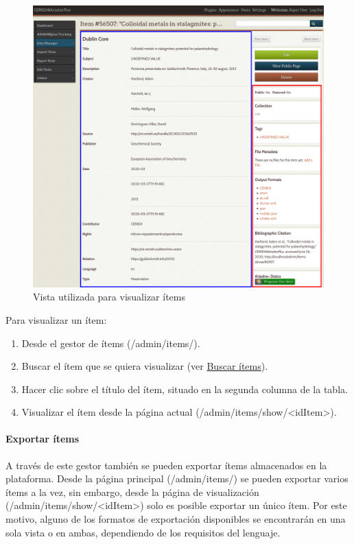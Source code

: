 \documentclass[
]{article}
\providecommand{\tightlist}{%
  \setlength{\itemsep}{0pt}\setlength{\parskip}{0pt}}
\begin{document}
\begin{figure}
\hypertarget{show-items-view}{%
\centering
\includegraphics{../_static/images/show-items-view.png}
\caption{Vista utilizada para visualizar ítems}\label{show-items-view}
}
\end{figure}

Para visualizar un ítem:

\begin{enumerate}
\def\labelenumi{\arabic{enumi}.}
\tightlist
\item
  Desde el gestor de ítems ({/admin/items/}).
\item
  Buscar el ítem que se quiera visualizar (ver
  \protect\hyperlink{buscar-uxedtems}{Buscar ítems}).
\item
  Hacer clic sobre el título del ítem, situado en la segunda columna de
  la tabla.
\item
  Visualizar el ítem desde la página actual
  ({/admin/items/show/\textless idItem\textgreater{}}).
\end{enumerate}

\hypertarget{exportar-uxedtems}{%
\paragraph{Exportar ítems}\label{exportar-uxedtems}}

A través de este gestor también se pueden exportar ítems almacenados en
la plataforma. Desde la página principal ({/admin/items/}) se pueden
exportar varios ítems a la vez, sin embargo, desde la página de
visualización ({/admin/items/show/\textless idItem\textgreater{}}) solo
es posible exportar un único ítem. Por este motivo, alguno de los
formatos de exportación disponibles se encontrarán en una sola vista o
en ambas, dependiendo de los requisitos del lenguaje.
\end{document}
